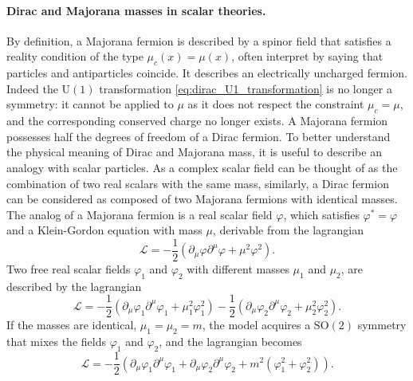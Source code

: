 \paragraph{Dirac and Majorana masses in scalar theories.}
By definition, a Majorana fermion is described by a spinor field that satisfies a reality condition of the type \(\mu_c (x)=\mu(x)\), often interpret by saying that particles and antiparticles coincide. It describes an electrically uncharged fermion. Indeed the \(\mathrm{U}(1)\)  transformation \eqref{eq:dirac_U1_transformation} is no longer a symmetry: it cannot be applied to \(\mu\) as it does not respect the constraint \(\mu_c = \mu\), and the corresponding conserved charge no longer exists. A Majorana fermion possesses half the degrees of freedom of a Dirac fermion.
To better understand the physical meaning of Dirac and Majorana mass, it is useful to describe an analogy with scalar particles. As a complex scalar field can be thought of as the combination of two real scalars with the same mass, similarly, a Dirac fermion can be considered as composed of two Majorana fermions with identical masses.
The analog of a Majorana fermion is a real scalar field \(\varphi\), which satisfies \(\varphi^* = \varphi\) and a Klein-Gordon equation with mass \(\mu\), derivable from the lagrangian
\begin{equation}
    \mathcal{L} = -\frac{1}{2} \left(\partial_\mu \varphi \partial^\mu \varphi + \mu^2 \varphi^2 \right).
    \label{eq:dirac_real_scalar_field_lagrangian}
\end{equation}
Two free real scalar fields \(\varphi_1\) and \(\varphi_2\) with different masses \(\mu_1\) and \(\mu_2\), are described by the lagrangian
\begin{equation}
    \mathcal{L} = -\frac{1}{2} \left(\partial_\mu \varphi_1 \partial^\mu \varphi_1 + \mu_1^2 \varphi_1^2 \right) - \frac{1}{2} \left(\partial_\mu \varphi_2 \partial^\mu \varphi_2 + \mu_2^2 \varphi_2^2 \right).
    \label{eq:dirac_two_real_scalar_fields_lagrangian}
\end{equation}
If the masses are identical, \(\mu_1 = \mu_2 = m\), the model acquires a \(\mathrm{SO}(2)\) symmetry that mixes the fields \(\varphi_1\) and \(\varphi_2\), and the lagrangian becomes
\begin{equation}
    \mathcal{L} = -\frac{1}{2} \left(\partial_\mu \varphi_1 \partial^\mu \varphi_1 + \partial_\mu \varphi_2 \partial^\mu \varphi_2 + m^2 (\varphi_1^2 + \varphi_2^2) \right).
    \label{eq:dirac_two_real_scalar_fields_equal_mass_lagrangian}
\end{equation}
